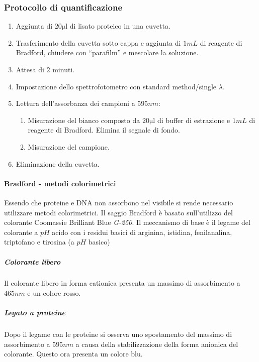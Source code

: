		\subsubsection{Protocollo di quantificazione}
		\begin{multicols}{2}
		\begin{enumerate}
			\item Aggiunta di $20\si{\micro\litre}$ di lisato proteico in una cuvetta.
			\item Trasferimento della cuvetta sotto cappa e aggiunta di $1\si{mL}$ di reagente di Bradford, chiudere con ``parafilm'' e mescolare la soluzione.
			\item Attesa di $2$ minuti.
			\item Impostazione dello spettrofotometro con standard method/single $\lambda$.
			\item Lettura dell'assorbanza dei campioni a $595\si{nm}$:
				\begin{enumerate}
					\item Misurazione del bianco composto da $20\si{\micro\litre}$ di buffer di estrazione e $1\si{mL}$ di reagente di Bradford.
						Elimina il segnale di fondo.
					\item Misurazione del campione.
				\end{enumerate}
			\item Eliminazione della cuvetta.
		\end{enumerate}
	\end{multicols}

			\paragraph{Bradford - metodi colorimetrici}
			Essendo che proteine e DNA non assorbono nel visibile si rende necessario utilizzare metodi colorimetrici.
			Il saggio Bradford \`e basato sull'utilizzo del colorante Coomassie Brilliant Blue \emph{G-250}. 
			Il meccanismo di base \`e il legame del colorante a $pH$ acido con i residui basici di arginina, istidina, fenilanalina, triptofano e tirosina (a $pH$ basico)
				
				\subparagraph{Colorante libero}
				Il colorante libero in forma cationica presenta un massimo di assorbimento a $465\si{nm}$ e un colore rosso.
				
				\subparagraph{Legato a proteine}
				Dopo il legame con le proteine si osserva uno spostamento del massimo di assorbimento a $595\si{nm}$ a causa della stabilizzazione della forma anionica del colorante.
				Questo ora presenta un colore blu.


